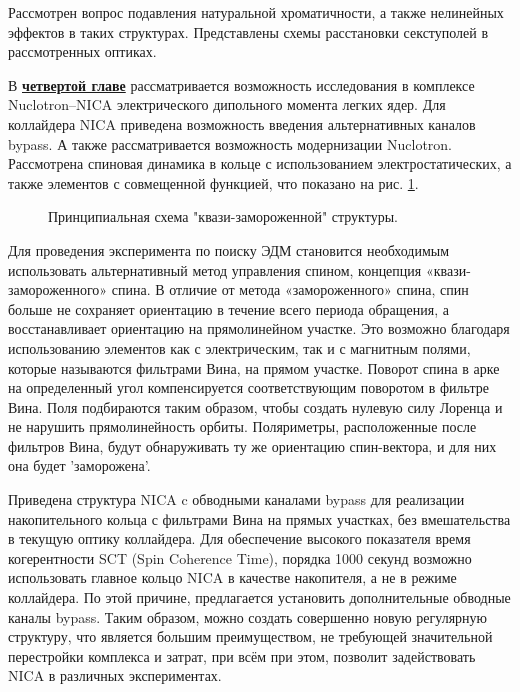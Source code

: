 \par Рассмотрен вопрос подавления натуральной хроматичности, а также нелинейных эффектов в таких структурах. Представлены схемы расстановки секступолей в рассмотренных оптиках.

В \underline{\textbf{четвертой главе}} рассматривается возможность исследования в комплексе Nuclotron–NICA электрического дипольного момента легких ядер. Для коллайдера NICA приведена возможность введения альтернативных каналов bypass. А также рассматривается возможность модернизации Nuclotron. Рассмотрена спиновая динамика в кольце с использованием электростатических, а также элементов с совмещенной функцией, что показано на рис. \ref{fig:QFS}.

\begin{figure}[ht]
    \caption{Принципиальная схема "квази-замороженной" структуры.}\label{fig:QFS}
\end{figure}

\par Для проведения эксперимента по поиску ЭДМ становится необходимым использовать альтернативный метод управления спином, концепция «квази-замороженного» спина. В отличие от метода «замороженного» спина, спин больше не сохраняет ориентацию в течение всего периода обращения, а восстанавливает ориентацию на прямолинейном участке. Это возможно благодаря использованию элементов как с электрическим, так и с магнитным полями, которые называются фильтрами Вина, на прямом участке. Поворот спина в арке на определенный угол компенсируется соответствующим поворотом в фильтре Вина. Поля подбираются таким образом, чтобы создать нулевую силу Лоренца и не нарушить прямолинейность орбиты. Поляриметры, расположенные после фильтров Вина, будут обнаруживать ту же ориентацию спин-вектора, и для них она будет 'заморожена'.

\par Приведена структура NICA c обводными каналами bypass для реализации накопительного кольца с фильтрами Вина на прямых участках, без вмешательства в текущую оптику коллайдера. Для обеспечение высокого показателя время когерентности SCT (Spin Coherence Time), порядка 1000 секунд возможно использовать главное кольцо NICA в качестве накопителя, а не в режиме коллайдера. По этой причине, предлагается установить дополнительные обводные каналы bypass. Таким образом, можно создать совершенно новую регулярную структуру, что является большим преимуществом, не требующей значительной перестройки комплекса и затрат, при всём при этом, позволит задействовать NICA в различных экспериментах.

